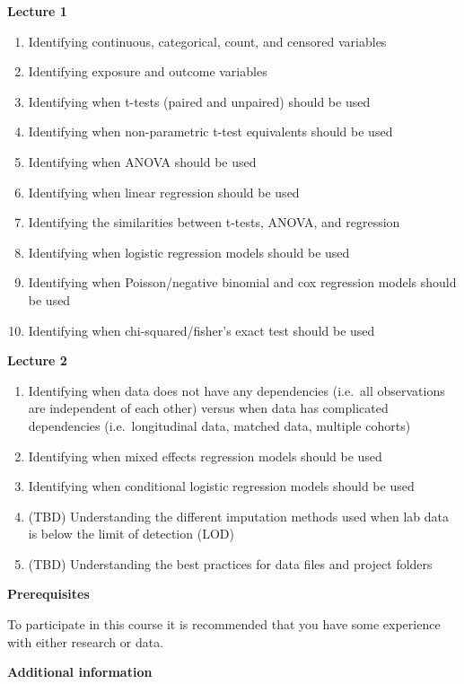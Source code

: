 \documentclass[12pt,]{article}
\providecommand{\tightlist}{%
  \setlength{\itemsep}{0pt}\setlength{\parskip}{0pt}}
\begin{document}
\textbf{Lecture 1}

\begin{enumerate}
\def\labelenumi{\arabic{enumi}.}
\tightlist
\item
  Identifying continuous, categorical, count, and censored variables
\item
  Identifying exposure and outcome variables
\item
  Identifying when t-tests (paired and unpaired) should be used
\item
  Identifying when non-parametric t-test equivalents should be used
\item
  Identifying when ANOVA should be used
\item
  Identifying when linear regression should be used
\item
  Identifying the similarities between t-tests, ANOVA, and regression
\item
  Identifying when logistic regression models should be used
\item
  Identifying when Poisson/negative binomial and cox regression models
  should be used
\item
  Identifying when chi-squared/fisher's exact test should be used
\end{enumerate}

\textbf{Lecture 2}

\begin{enumerate}
\def\labelenumi{\arabic{enumi}.}
\tightlist
\item
  Identifying when data does not have any dependencies (i.e.~all
  observations are independent of each other) versus when data has
  complicated dependencies (i.e.~longitudinal data, matched data,
  multiple cohorts)
\item
  Identifying when mixed effects regression models should be used
\item
  Identifying when conditional logistic regression models should be used
\item
  (TBD) Understanding the different imputation methods used when lab
  data is below the limit of detection (LOD)
\item
  (TBD) Understanding the best practices for data files and project
  folders
\end{enumerate}

\textbf{Prerequisites}

To participate in this course it is recommended that you have some
experience with either research or data.

\textbf{Additional information}
\end{document}
